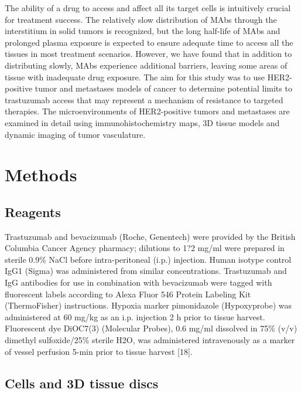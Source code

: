 The ability of a drug to access and affect all its target cells is intuitively crucial for treatment success.
The relatively slow distribution of MAbs through the interstitium in solid tumors is recognized, but the long half-life of MAbs and prolonged plasma exposure is expected to ensure adequate time to access all the tissues in most treatment scenarios.
However, we have found that in addition to distributing slowly, MAbs experience additional barriers, leaving some areas of tissue with inadequate drug exposure.
The aim for this study was to use HER2-positive tumor and metastases models of cancer to determine potential limits to trastuzumab access that may represent a mechanism of resistance to targeted therapies.
The microenvironments of HER2-positive tumors and metastases are examined in detail using immunohistochemistry maps, 3D tissue models and dynamic imaging of tumor vasculature.

\section{Methods}

\subsection{Reagents}

Trastuzumab and bevacizumab (Roche, Genentech) were provided by the British Columbia Cancer Agency pharmacy; dilutions to 1?2 mg/ml were prepared in sterile 0.9\% NaCl before intra-peritoneal (i.p.) injection.
Human isotype control IgG1 (Sigma) was administered from similar concentrations.
Trastuzumab and IgG antibodies for use in combination with bevacizumab were tagged with fluorescent labels according to Alexa Fluor 546 Protein Labeling Kit (ThermoFisher) instructions.
Hypoxia marker pimonidazole (Hypoxyprobe) was administered at 60 mg/kg as an i.p.
injection 2 h prior to tissue harvest.
Fluorescent dye DiOC7(3) (Molecular Probes), 0.6 mg/ml dissolved in 75\% (v/v) dimethyl sulfoxide/25\% sterile H2O, was administered intravenously as a marker of vessel perfusion 5-min prior to tissue harvest [18].

\subsection{Cells and 3D tissue discs}

